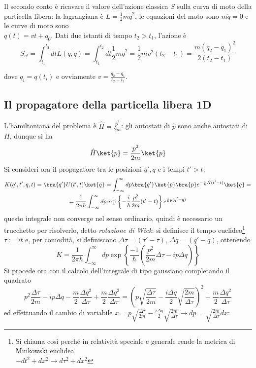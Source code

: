 Il secondo conto è ricavare il valore dell'azione classica $S$ sulla curva di moto della particella libera:
la lagrangiana è $L=\frac{1}{2}m\dot q^2$, le equazioni del moto sono $m\ddot{q}=0$ e le curve di moto sono\\
$q(t) = vt+q_0$. Dati due istanti di tempo $t_2>t_1$, l'azione è
\begin{equation}
S_{cl}=\int_{t_1}^{t_2}dtL(q,\dot q)=\int_{t_1}^{t_2}dt\frac{1}{2}m\dot{q}^2=\frac{1}{2}mv^2(t_2-t_1)
=\frac{m(q_2-q_1)^2}{2(t_2-t_1)}
\label{eq:S_cl_free}
\end{equation}

dove $q_i = q(t_i)$ e ovviamente $v=\frac{q_2-q_1}{t_2-t_1}$.

\subsection{Il propagatore della particella libera 1D}
L'hamiltoniana del problema è $\hat H=\frac{\hat p^2}{2m}$: gli autostati di $\hat p$ sono anche autostati
di $H$, dunque si ha
$$\hat H \ket{p}=\frac{p^2}{2m}\ket{p}$$
Si consideri ora il propagatore tra le posizioni $q',q$ e i tempi $t'>t$:
\begin{gather*}
K(q',t',q,t) = \bra{q'}U(t',t)\ket{q} =
\int_{-\infty}^{\infty} dp \bra{q'}\ket{p}\bra{p}e^{-\frac{i}{\hbar}\hat H(t'-t)}\ket{q} =\\
=\frac{1}{2\pi\hbar}\int_{-\infty}^{\infty}dp \exp\left\{-\frac{i}{\hbar}\frac{p^2}{2m}(t'-t)\right\}
e^{\frac{i}{\hbar}p(q'-q)}
\end{gather*}
questo integrale non converge nel senso ordinario, quindi è necessario un trucchetto per risolverlo, detto
\textit{rotazione di Wick}: si definisce il tempo euclideo\footnote{
Si chiama così perché in relatività speciale e generale rende la metrica di Minkowski euclidea\\
$-dt^2+dx^2 \rightarrow d\tau^2+dx^2$}
$\tau :=it$ e, per comodità, si definiscono $\Delta\tau = (\tau'-\tau)$, $\Delta q=(q'-q)$, ottenendo
$$ K = \frac{1}{2\pi\hbar}\int_{-\infty}^{\infty}dp\exp\left\{\frac{-1}{\hbar}\left(\frac{p^2}{2m}
\Delta\tau-ip\Delta q\right)\right\} $$
Si procede ora con il calcolo dell'integrale di tipo gaussiano completando il quadrato
$$p^2\frac{\Delta\tau}{2m}-ip\Delta q - \frac{m}{2}\frac{\Delta q^2}{\Delta\tau}+\frac{m}{2}\frac{\Delta q^2}
{\Delta\tau}= \left(p\sqrt{\frac{\Delta\tau}{2m}}-\frac{i\Delta q}{2}\sqrt{\frac{2m}{\Delta\tau}}\right)^2 +
\frac{m}{2}\frac{\Delta q^2}{\Delta\tau}$$
ed effettuando il cambio di variabile $x=p\sqrt{\frac{\Delta\tau}{2m}}-\frac{i\Delta q}{2}\sqrt{\frac{2m}{\Delta\tau}}\rightarrow dp = \sqrt{\frac{2m}{\Delta\tau}}dx$:
